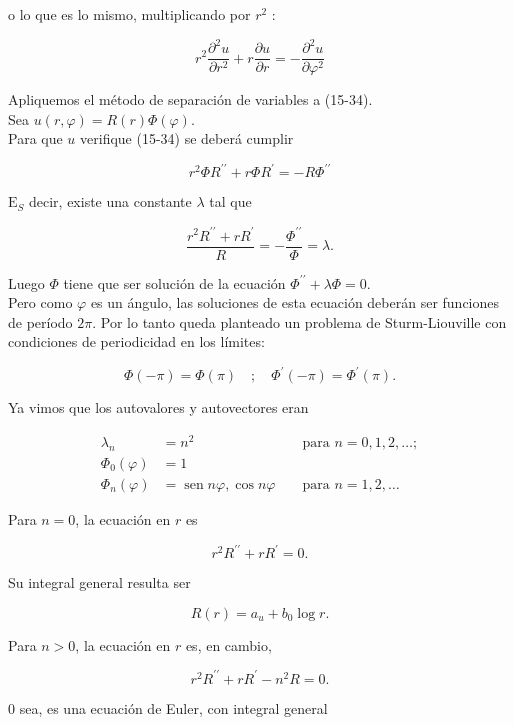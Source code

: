 \documentclass[10pt]{article}
\theoremstyle{plain}
\theoremstyle{definition}
\theoremstyle{remark}
\begin{document}
o lo que es lo mismo, multiplicando por $r^{2}$ :


\begin{equation*}
r^{2} \frac{\partial^{2} u}{\partial r^{2}}+r \frac{\partial u}{\partial r}=-\frac{\partial^{2} u}{\partial \varphi^{2}} \tag{15-34}
\end{equation*}


Apliquemos el método de separación de variables a (15-34).\\
Sea $u(r, \varphi)=R(r) \Phi(\varphi)$.\\
Para que $u$ verifique (15-34) se deberá cumplir

$$
r^{2} \Phi R^{\prime \prime}+r \Phi R^{\prime}=-R \Phi^{\prime \prime}
$$

$\mathrm{E}_{S}$ decir, existe una constante $\lambda$ tal que


$$
\frac{r^{2} R^{\prime \prime}+r R^{\prime}}{R}=-\frac{\Phi^{\prime \prime}}{\Phi}=\lambda .
$$

Luego $\Phi$ tiene que ser solución de la ecuación $\Phi^{\prime \prime}+\lambda \Phi=0$.\\
Pero como $\varphi$ es un ángulo, las soluciones de esta ecuación deberán ser funciones de período $2 \pi$. Por lo tanto queda planteado un problema de Sturm-Liouville con condiciones de periodicidad en los límites:

$$
\Phi(-\pi)=\Phi(\pi) \quad ; \quad \Phi^{\prime}(-\pi)=\Phi^{\prime}(\pi) .
$$

Ya vimos que los autovalores y autovectores eran

$$
\begin{aligned}
\lambda_{n} & =n^{2} & & \text { para } n=0,1,2, \ldots ; \\
\Phi_{0}(\varphi) & =1 & & \\
\Phi_{n}(\varphi) & =\operatorname{sen} n \varphi, \cos n \varphi & & \text { para } n=1,2, \ldots
\end{aligned}
$$

Para $n=0$, la ecuación en $r$ es

$$
r^{2} R^{\prime \prime}+r R^{\prime}=0 .
$$

Su integral general resulta ser

$$
R(r)=a_{u}+b_{0} \log r .
$$

Para $n>0$, la ecuación en $r$ es, en cambio,

$$
r^{2} R^{\prime \prime}+r R^{\prime}-n^{2} R=0 .
$$

0 sea, es una ecuación de Euler, con integral general
\end{document}
